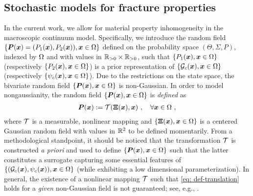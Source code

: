 \subsection{Stochastic models for fracture properties}

In the current work, we allow for material property inhomogeneity in the macroscopic continuum model. Specifically, we introduce the random field $\{\boldsymbol{P}(\boldsymbol{x}) = (P_1(\boldsymbol{x}), P_2(\boldsymbol{x})), \boldsymbol{x} \in \Omega\}$ defined on the probability space $(\Theta, \Sigma, P)$, indexed by $\Omega$ and with values in $\mathbb{R}_{>0} \times \mathbb{R}_{>0}$, such that $\{P_1(\boldsymbol{x}), \boldsymbol{x} \in \Omega\}$
(respectively $\{P_2(\boldsymbol{x}), \boldsymbol{x} \in \Omega\}$) is a prior representation of $\{{\mathcal{G}_c}(\boldsymbol{x}), \boldsymbol{x} \in \Omega\}$ (respectively $\{\psi_c(\boldsymbol{x}), \boldsymbol{x} \in \Omega\}$).
Due to the restrictions on the state space, the bivariate random field $\{\boldsymbol{P}(\boldsymbol{x}), \boldsymbol{x} \in \Omega\}$ is non-Gaussian. In order to model nongaussianity, the random field $\{\boldsymbol{P}(\boldsymbol{x}), \boldsymbol{x} \in \Omega\}$ is \textit{defined} as
\begin{align}
  \boldsymbol{P}(\boldsymbol{x}) := \mathcal{T}(\boldsymbol{\Xi}(\boldsymbol{x}), \boldsymbol{x})~, \quad \forall \boldsymbol{x} \in \Omega~, \label{eq: def-translation}
\end{align}
where $\mathcal{T}$ is a measurable, nonlinear mapping and $\{\boldsymbol{\Xi}(\boldsymbol{x}),\boldsymbol{x} \in \Omega\}$ is a centered Gaussian random field with values in $\mathbb{R}^2$ to be defined momentarily. From a methodological standpoint, it should be noticed that the transformation $\mathcal{T}$ is constructed \textit{a priori} and used to define $\{\boldsymbol{P}(\boldsymbol{x}), \boldsymbol{x} \in \Omega\}$ such that the latter constitutes a surrogate capturing some essential features of $\{({\mathcal{G}_c}(\boldsymbol{x}),\psi_c(\boldsymbol{x})), \boldsymbol{x} \in \Omega\}$
(while exhibiting a low dimensional parameterization). In general, the existence of a nonlinear mapping $\mathcal{T}$ such that \eqref{eq: def-translation} holds for a \textit{given} non-Gaussian field is not guaranteed; see, e.g., \cite{Grigoriu2009}.

